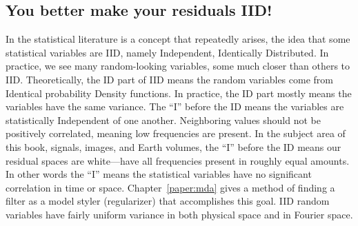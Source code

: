 \subsection{You better make your residuals IID!}
In the statistical literature is a concept that repeatedly arises,
the idea that some statistical variables are IID, namely Independent, Identically Distributed.
In practice, we see many random-looking variables,
some much closer than others to IID.
Theoretically, the ID part of IID means the random variables come from Identical
probability Density functions.
In practice, the ID part mostly means the variables have the same variance.
The ``I'' before the ID means the variables are statistically Independent of one another.
Neighboring values should not be positively correlated, meaning low frequencies are present.
In the subject area of this book, signals, images, and Earth volumes,
the ``I'' before the ID means our residual spaces are white---have
all frequencies present in roughly equal amounts.
In other words the ``I'' means the statistical variables
have no significant correlation in time or space.
Chapter~\ref{paper:mda} gives a method of finding a
filter as a model styler (regularizer) that accomplishes this goal.
IID random variables have fairly uniform variance in both physical space and in Fourier space.
\par
{}

